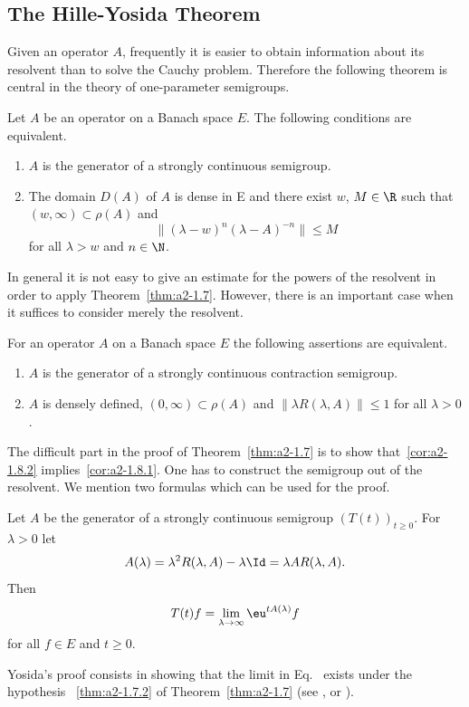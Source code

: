 \subsection{The Hille-Yosida Theorem} \label{subsec:a2-1.se3}%
Given an operator $A$, frequently it is easier to obtain information about its resolvent than to solve the Cauchy problem.
Therefore the following theorem is central in the theory of one-parameter semigroups.
\begin{theorem}\label{thm:a2-1.7}
Let $A$ be an operator on a Banach space $E$.
The following conditions are equivalent.
\begin{enumerate}[\upshape (a)]
\item \label{thm:a2-1.7.1}
$A$ is the generator of a strongly continuous semigroup.
\item \label{thm:a2-1.7.2}
The domain  $D(A)$ of\/ $A$ is dense in E and there exist $w$, $M \in \R$ such that $(w,\infty) \subset \rho(A)$ and
\[
    \| {(\lambda - w)^{n}} (\lambda-A)^{-n}\| \leq M 
\]
for all $\lambda > w$ and $n \in \N$.
\end{enumerate}
\end{theorem}
In general it is not easy to give an estimate for the powers of the resolvent in order to apply Theorem~\ref{thm:a2-1.7}. 
However, there is an important case when it suffices to consider merely the resolvent.
\begin{corollary}\label{cor:a2-1.8}
For an operator $A$ on a Banach space $E$ the following assertions are equivalent.
\begin{enumerate}[\upshape (a)]
\item \label{cor:a2-1.8.1}
$A$ is the generator of a strongly continuous contraction semigroup.
\item \label{cor:a2-1.8.2}
$A$ is densely defined, $(0,\infty) \subset \rho(A)$ and $\|\lambda R(\lambda,A)\| \leq 1$ for all $\lambda > 0$.
\end{enumerate}
\end{corollary}
The difficult part in the proof of Theorem~\ref{thm:a2-1.7}   is to show that~\ref{cor:a2-1.8.2}   implies~\ref{cor:a2-1.8.1}. 
One has to construct the semigroup out of the resolvent.
We mention two formulas which can be used for the proof.
\begin{proposition}\label{prop:a2-1.9}
Let $A$ be the generator of a strongly continuous semigroup
$(T(t))_{t \geq 0}$.
For $\lambda > 0$ let 
\[
A(\lambda) = \lambda^{2} R(\lambda,A)-\lambda \Id  =\lambda A R(\lambda,A).
\]
Then
\begin{equation}\label{eq:a2-1.2}
    T(t)f = \lim_{\lambda \to \infty} \eu^{tA(\lambda)}f
\end{equation}
for all $f \in E$ and $t \geq 0$.
\end{proposition}
Yosida's proof consists in showing that the limit in Eq.~ exists under the hypothesis ~\ref{thm:a2-1.7.2} of Theorem~\ref{thm:a2-1.7}  
(see \textcite{davies:1980}, \textcite{goldstein:1985b} or \textcite{pazy:1983}).

